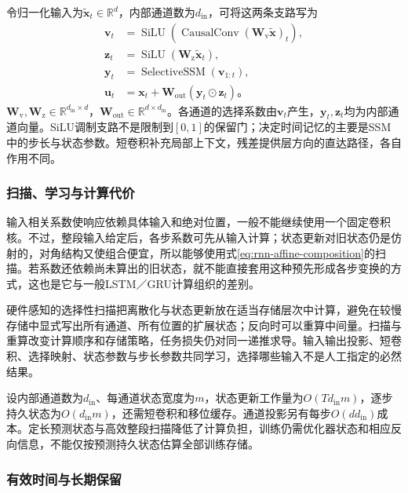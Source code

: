 令归一化输入为$\widetilde{\bm x}_t\in\mathbb R^d$，内部通道数为$d_{\mathrm{in}}$，可将这两条支路写为
\begin{equation}
  \begin{aligned}
    \bm v_t&=\operatorname{SiLU}\!\left(\operatorname{CausalConv}
                (\bm W_{\mathrm v}\widetilde{\bm x})_t\right),\\
    \bm z_t&=\operatorname{SiLU}(\bm W_{\mathrm z}\widetilde{\bm x}_t),\\
    \bm y_t&=\operatorname{SelectiveSSM}(\bm v_{1:t}),\\
    \bm u_t&=\bm x_t+\bm W_{\mathrm{out}}(\bm y_t\odot\bm z_t)\text{。}
  \end{aligned}
  \label{eq:rnn-mamba-block}
\end{equation}
$\bm W_{\mathrm v},\bm W_{\mathrm z}\in\mathbb R^{d_{\mathrm{in}}\times d}$，$\bm W_{\mathrm{out}}\in\mathbb R^{d\times d_{\mathrm{in}}}$。各通道的选择系数由$\bm v_t$产生，$\bm y_t,\bm z_t$均为内部通道向量。SiLU调制支路不是限制到$[0,1]$的保留门；决定时间记忆的主要是SSM中的步长与状态参数。短卷积补充局部上下文，残差提供层方向的直达路径，各自作用不同。

\subsubsection{扫描、学习与计算代价}
\label{sec:rnn-mamba-scan}

输入相关系数使响应依赖具体输入和绝对位置，一般不能继续使用一个固定卷积核。不过，整段输入给定后，各步系数可先从输入计算；状态更新对旧状态仍是仿射的，对角结构又使组合便宜，所以能够使用式\eqref{eq:rnn-affine-composition}的扫描。若系数还依赖尚未算出的旧状态，就不能直接套用这种预先形成各步变换的方式，这也是它与一般LSTM／GRU计算组织的差别。

硬件感知的选择性扫描把离散化与状态更新放在适当存储层次中计算，避免在较慢存储中显式写出所有通道、所有位置的扩展状态；反向时可以重算中间量。扫描与重算改变计算顺序和存储策略，任务损失仍对同一递推求导。输入输出投影、短卷积、选择映射、状态参数与步长参数共同学习，选择哪些输入不是人工指定的必然结果。

设内部通道数为$d_{\mathrm{in}}$、每通道状态宽度为$m$，状态更新工作量为$O(Td_{\mathrm{in}}m)$，逐步持久状态为$O(d_{\mathrm{in}}m)$，还需短卷积和移位缓存。通道投影另有每步$O(dd_{\mathrm{in}})$成本。定长预测状态与高效整段扫描降低了计算负担，训练仍需优化器状态和相应反向信息，不能仅按预测持久状态估算全部训练存储。

\subsubsection{有效时间与长期保留}
\label{sec:rnn-mamba-long-memory}

